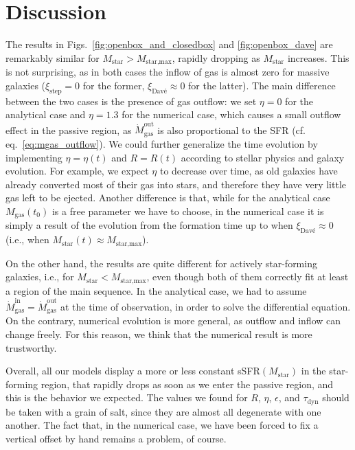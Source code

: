 \documentclass[fleqn,usenatbib]{mnras}
\begin{document}
\section{Discussion}\label{sec:discussion}
The results in Figs.~\ref{fig:openbox_and_closedbox} and \ref{fig:openbox_dave} are remarkably similar for $M_\text{star}>M_\text{star,max}$, rapidly dropping as $M_\text{star}$ increases. This is not surprising, as in both cases the inflow of gas is almost zero for massive galaxies ($\xi_\text{step}=0$ for the former, $\xi_\text{Davé}\approx0$ for the latter). 
The main difference between the two cases is the presence of gas outflow: we set $\eta=0$ for the analytical case and $\eta=1.3$ for the numerical case, which causes a small outflow effect in the passive region, as $\dot{M}_\text{gas}^\text{out}$ is also proportional to the SFR (cf. eq.~\ref{eq:mgas_outflow}). We could further generalize the time evolution by implementing $\eta=\eta(t)$ and $R=R(t)$ according to stellar physics and galaxy evolution. For example, we expect $\eta$ to decrease over time, as old galaxies have already converted most of their gas into stars, and therefore they have very little gas left to be ejected.
Another difference is that, while for the analytical case $M_\text{gas}(t_0)$ is a free parameter we have to choose, in the numerical case it is simply a result of the evolution from the formation time up to when $\xi_\text{Davé}\approx0$ (i.e., when $M_\text{star}(t)\approx M_{\text{star,max}}$).

On the other hand, the results are quite different for actively star-forming galaxies, i.e., for $M_\text{star}<M_\text{star,max}$, even though both of them correctly fit at least a region of the main sequence. In the analytical case, we had to assume $\dot{M}_\text{gas}^\text{in}=\dot{M}_\text{gas}^\text{out}$ at the time of observation, in order to solve the differential equation. On the contrary, numerical evolution is more general, as outflow and inflow can change freely. For this reason, we think that the numerical result is more trustworthy.

Overall, all our models display a more or less constant sSFR$(M_\text{star})$ in the star-forming region, that rapidly drops as soon as we enter the passive region, and this is the behavior we expected. The values we found for $R$, $\eta$, $\epsilon$, and $\tau_\text{dyn}$ should be taken with a grain of salt, since they are almost all degenerate with one another. The fact that, in the numerical case, we have been forced to fix a vertical offset by hand remains a problem, of course. 
\end{document}
